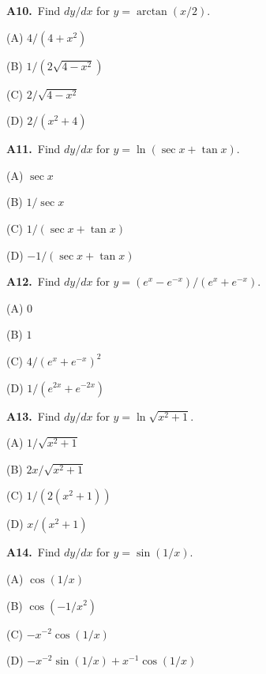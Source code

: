 \documentclass[11pt]{article}
\begin{document}
\bigskip\noindent\textbf{A10.}\ Find $dy/dx$ for $y=\arctan(x/2)$.
\begin{list}{}{\setlength{\leftmargin}{3em}\setlength{\labelwidth}{2.5em}\setlength{\itemsep}{0pt}\setlength{\topsep}{2pt}}
\item[(A)] $4/(4+x^2)$
\item[(B)] $1/(2\sqrt{4-x^2})$
\item[(C)] $2/\sqrt{4-x^2}$
\item[(D)] $2/(x^2+4)$
\end{list}

\bigskip\noindent\textbf{A11.}\ Find $dy/dx$ for $y=\ln(\sec x+\tan x)$.
\begin{list}{}{\setlength{\leftmargin}{3em}\setlength{\labelwidth}{2.5em}\setlength{\itemsep}{0pt}\setlength{\topsep}{2pt}}
\item[(A)] $\sec x$
\item[(B)] $1/\sec x$
\item[(C)] $1/(\sec x+\tan x)$
\item[(D)] $-1/(\sec x+\tan x)$
\end{list}

\bigskip\noindent\textbf{A12.}\ Find $dy/dx$ for $y=(e^x-e^{-x})/(e^x+e^{-x})$.
\begin{list}{}{\setlength{\leftmargin}{3em}\setlength{\labelwidth}{2.5em}\setlength{\itemsep}{0pt}\setlength{\topsep}{2pt}}
\item[(A)] $0$
\item[(B)] $1$
\item[(C)] $4/(e^x+e^{-x})^2$
\item[(D)] $1/(e^{2x}+e^{-2x})$
\end{list}

\bigskip\noindent\textbf{A13.}\ Find $dy/dx$ for $y=\ln\sqrt{x^2+1}$.
\begin{list}{}{\setlength{\leftmargin}{3em}\setlength{\labelwidth}{2.5em}\setlength{\itemsep}{0pt}\setlength{\topsep}{2pt}}
\item[(A)] $1/\sqrt{x^2+1}$
\item[(B)] $2x/\sqrt{x^2+1}$
\item[(C)] $1/(2(x^2+1))$
\item[(D)] $x/(x^2+1)$
\end{list}

\bigskip\noindent\textbf{A14.}\ Find $dy/dx$ for $y=\sin(1/x)$.
\begin{list}{}{\setlength{\leftmargin}{3em}\setlength{\labelwidth}{2.5em}\setlength{\itemsep}{0pt}\setlength{\topsep}{2pt}}
\item[(A)] $\cos(1/x)$
\item[(B)] $\cos(-1/x^2)$
\item[(C)] $-x^{-2}\cos(1/x)$
\item[(D)] $-x^{-2}\sin(1/x)+x^{-1}\cos(1/x)$
\end{list}
\end{document}
